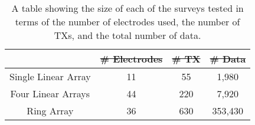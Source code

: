 \documentclass[preprint,authoryear,12pt]{elsarticle}
\providecommand{\DIFaddtex}[1]{{\protect\color{blue}\uwave{#1}}} %
\providecommand{\DIFdeltex}[1]{{\protect\color{red}\sout{#1}}}                      %
\providecommand{\DIFaddFL}[1]{\DIFadd{#1}} %
\providecommand{\DIFdelFL}[1]{\DIFdel{#1}} %
\providecommand{\DIFaddbeginFL}{} %
\providecommand{\DIFaddendFL}{} %
\providecommand{\DIFdelbeginFL}{} %
\providecommand{\DIFdelendFL}{} %
\providecommand{\DIFadd}[1]{\texorpdfstring{\DIFaddtex{#1}}{#1}} %
\providecommand{\DIFdel}[1]{\texorpdfstring{\DIFdeltex{#1}}{}} %
\begin{document}
\begin{table} [htp]
   \footnotesize
    \begin{center}
        \begin{tabular}{| c | c | c | c |}
            \hline
             & \DIFdelbeginFL \DIFdelFL{\# Electrodes }\DIFdelendFL \DIFaddbeginFL \textbf{\DIFaddFL{\mbox{\boldmath$\#$} Electrodes}} \DIFaddendFL & \DIFdelbeginFL \DIFdelFL{\# TX }\DIFdelendFL \DIFaddbeginFL \textbf{\DIFaddFL{\mbox{\boldmath$\#$} TX}} \DIFaddendFL & \DIFdelbeginFL \DIFdelFL{\# Data}\DIFdelendFL \DIFaddbeginFL \textbf{\DIFaddFL{\mbox{\boldmath$\#$} Data}}\DIFaddendFL \\
            \hline
            Single Linear Array & 11 & 55 & 1,980 \\
            \hline
            Four Linear Arrays & 44 & 220 & 7,920 \\
            \hline
            Ring Array & 36 & 630 & 353,430 \\
            \hline
        \end{tabular}
    \end{center}
\caption{A table showing the size of each of the surveys tested in terms of the number of electrodes used, the number of TXs, and the total number of data.}
\label{table:SurveyDesign_FullSurveyStats}
\end{table}
\end{document}
